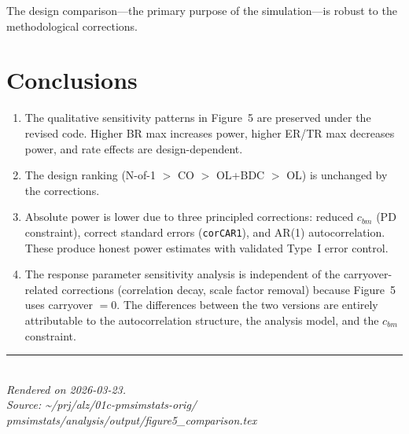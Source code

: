 \documentclass[11pt]{article}
\begin{document}
The design comparison---the primary purpose of the
simulation---is robust to the methodological corrections.

\section{Conclusions}

\begin{enumerate}
\item The qualitative sensitivity patterns in Figure~5 are
  preserved under the revised code. Higher BR max increases
  power, higher ER/TR max decreases power, and rate effects
  are design-dependent.

\item The design ranking (N-of-1 $>$ CO $>$ OL+BDC $>$ OL)
  is unchanged by the corrections.

\item Absolute power is lower due to three principled
  corrections: reduced $c_{bm}$ (PD constraint), correct
  standard errors (\texttt{corCAR1}), and AR(1)
  autocorrelation. These produce honest power estimates
  with validated Type~I error control.

\item The response parameter sensitivity analysis is
  independent of the carryover-related corrections
  (correlation decay, scale factor removal) because
  Figure~5 uses carryover $= 0$. The differences between
  the two versions are entirely attributable to the
  autocorrelation structure, the analysis model, and the
  $c_{bm}$ constraint.
\end{enumerate}

\vfill
\noindent\rule{\textwidth}{0.4pt}\\
{\small\textit{Rendered on 2026-03-23.}\\
\textit{Source: \textasciitilde/prj/alz/01c-pmsimstats-orig/%
pmsimstats/analysis/output/figure5\_comparison.tex}}
\end{document}
